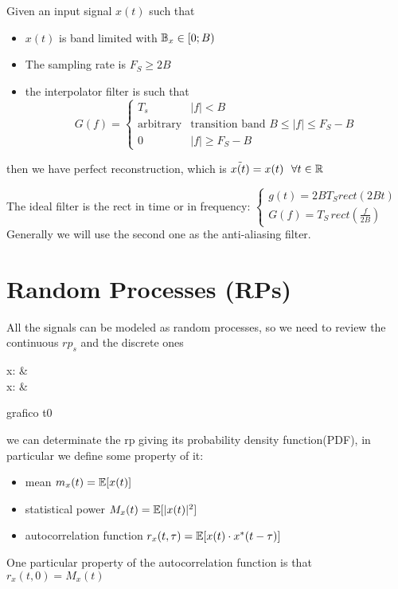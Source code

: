 \begin{theorem}
  Given an input signal $x(t)$ such that
  \begin{itemize}
    \item $x(t)$ is band limited with $\mathbb{B}_x \in [0;B)$
    \item The sampling rate is $F_S \ge 2 B$
    \item the interpolator filter is such that
    \begin{equation} G(f) =
      \begin{cases}
        T_s & |f| < B \\
        \text{arbitrary} & \text{transition band } B \le |f| \le F_S - B\\
        0 & |f| \ge F_S - B
    \end{cases}\end{equation}
  \end{itemize}
then we have perfect reconstruction, which is $\tilde{x(t)} = x(t) ~~\forall t \in \mathbb{R}$
\end{theorem}

The ideal filter is the rect in time or in frequency:
$\begin{cases}g(t) = 2B T_S rect(2 B t) \\G(f) = T_S\, rect(\frac{f}{2B}) \end{cases}$
Generally we will use the second one as the anti-aliasing filter.

\begin{theorem}

\end{theorem}
\section{Random Processes (RPs)}
All the signals can be modeled as random processes, so we need to review the continuous $rp_s$ and the discrete ones

\begin{esp}
  x: \quad &\R \times \Omega \to \R \\
  x:  \quad& \Z \times \Omega \to \R
\end{esp}

grafico t0

we can determinate the rp giving its probability density function(PDF), in particular we define some property of it:
\begin{itemize}
  \item mean $m_x(t)=\mathbb{E}[x(t)]$
  \item statistical power $M_x(t)=\mathbb{E}[|x(t)|^2]$
  \item autocorrelation function $r_x(t,\tau)=\mathbb{E}[x(t)\cdot x^*(t-\tau)]$
\end{itemize}
One particular property of the autocorrelation function is that $r_x(t,0)=M_x(t)$

